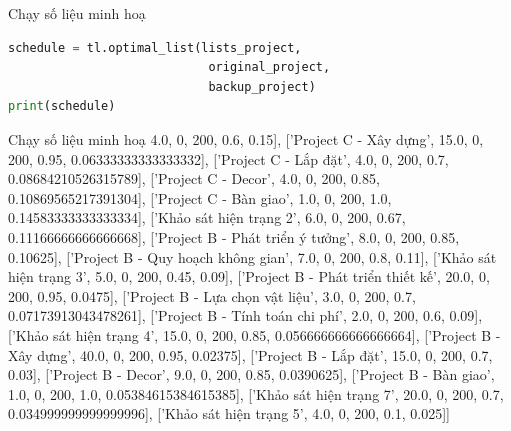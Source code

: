 \documentclass[10pt]{beamer}
\begin{document}
\begin{frame}[fragile]{Chạy số liệu minh hoạ}
\begin{lstlisting}[language=Python]
schedule = tl.optimal_list(lists_project,
                            original_project,
                            backup_project)
print(schedule)
\end{lstlisting}

\onslide<2->{{\scriptsize [['Project A - Phát triển ý tưởng', 4.0, 0, 200, 0.85, 0.2125], ['Project A - Quy hoạch không gian', 3.0, 0, 200, 0.8, 0.2357142857142857], ['Project C - Phát triển ý tưởng', 5.0, 0, 200, 0.85, 0.16999999999999998], ['Project C - Quy hoạch không gian', 2.0, 0, 200, 0.8, 0.2357142857142857], ['Project A - Phát triển thiết kế', 5.0, 0, 200, 0.75, 0.15], ['Project A - Lựa chọn vật liệu', 2.0, 0, 200, 0.7, 0.20714285714285713], ['Project A - Tính toán chi phí', 2.0, 0, 200, 0.6, 0.22777777777777775], ['Project A - Xây dựng', 10.0, 0, 200, 0.95, 0.095], ['Project A - Lắp đặt', 4.0, 0, 200, 0.7, 0.11785714285714285], ['Project A - Decor', 3.0, 0, 200, 0.85, 0.14705882352941177], ['Project A - Bàn giao', 1.0, 0, 200, 1.0, 0.19444444444444445], ['Project C - Phát triển thiết kế', 4.0, 0, 200, 0.75, 0.1875], ['Project C - Lựa chọn vật liệu', 6.0, 0, 200, 0.7, 0.11666666666666665], ['Project C - Tính toán chi phí', 1.0, 0, 200, 0.6, 0.1857142857142857], ['Khảo sát hiện trạng 1', 2.0, 0, 200, 0.33, 0.165], ['Khảo sát hiện trạng 6',
}}
    
\end{frame}

\begin{frame}{Chạy số liệu minh hoạ}
\footnotesize
4.0, 0, 200, 0.6, 0.15], ['Project C - Xây dựng', 15.0, 0, 200, 0.95, 0.06333333333333332], ['Project C - Lắp đặt', 4.0, 0, 200, 0.7, 0.08684210526315789], ['Project C - Decor', 4.0, 0, 200, 0.85, 0.10869565217391304], ['Project C - Bàn giao', 1.0, 0, 200, 1.0, 0.14583333333333334], ['Khảo sát hiện trạng 2', 6.0, 0, 200, 0.67, 0.11166666666666668], ['Project B - Phát triển ý tưởng', 8.0, 0, 200, 0.85, 0.10625], ['Project B - Quy hoạch không gian', 7.0, 0, 200, 0.8, 0.11], ['Khảo sát hiện trạng 3', 5.0, 0, 200, 0.45, 0.09], ['Project B - Phát triển thiết kế', 20.0, 0, 200, 0.95, 0.0475], ['Project B - Lựa chọn vật liệu', 3.0, 0, 200, 0.7, 0.07173913043478261], ['Project B - Tính toán chi phí', 2.0, 0, 200, 0.6, 0.09], ['Khảo sát hiện trạng 4', 15.0, 0, 200, 0.85, 0.056666666666666664], ['Project B - Xây dựng', 40.0, 0, 200, 0.95, 0.02375], ['Project B - Lắp đặt', 15.0, 0, 200, 0.7, 0.03], ['Project B - Decor', 9.0, 0, 200, 0.85, 0.0390625], ['Project B - Bàn giao', 1.0, 0, 200, 1.0, 0.05384615384615385], ['Khảo sát hiện trạng 7', 20.0, 0, 200, 0.7, 0.034999999999999996], ['Khảo sát hiện trạng 5', 4.0, 0, 200, 0.1, 0.025]]
\end{frame}
\end{document}
